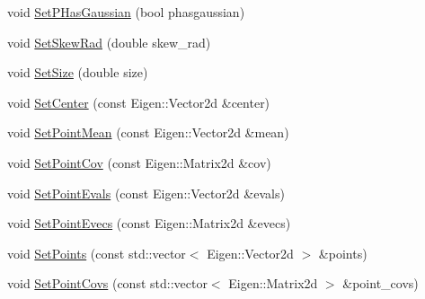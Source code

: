 \begin{DoxyCompactItemize}
\item 
void \hyperlink{classCellInterface_a9128ca32285aa988cea84164ba08096b}{Set\+P\+Has\+Gaussian} (bool phasgaussian)
\item 
void \hyperlink{classCellInterface_a2dd7e0d29d71fa86b9abb188a77fdf03}{Set\+Skew\+Rad} (double skew\+\_\+rad)
\item 
void \hyperlink{classCellInterface_a100dd6525d41dc526848a5f0e96052d4}{Set\+Size} (double size)
\item 
void \hyperlink{classCellInterface_ac566923857bbfb7f6cf9c69bc8efd241}{Set\+Center} (const Eigen\+::\+Vector2d \&center)
\item 
void \hyperlink{classCellInterface_a4d6d4a597eb09ba2098ae62f0a846e80}{Set\+Point\+Mean} (const Eigen\+::\+Vector2d \&mean)
\item 
void \hyperlink{classCellInterface_a4f7df38faf10bc512fa7a640f6ec379e}{Set\+Point\+Cov} (const Eigen\+::\+Matrix2d \&cov)
\item 
void \hyperlink{classCellInterface_a5810d27097b1ecb8a4f4764ea18cec51}{Set\+Point\+Evals} (const Eigen\+::\+Vector2d \&evals)
\item 
void \hyperlink{classCellInterface_a34d4b95685b82f27d36479e868c35faa}{Set\+Point\+Evecs} (const Eigen\+::\+Matrix2d \&evecs)
\item 
void \hyperlink{classCellInterface_a6597daae0e13681de7c666828ab7a722}{Set\+Points} (const std\+::vector$<$ Eigen\+::\+Vector2d $>$ \&points)
\item 
void \hyperlink{classCellInterface_a3ad8b58a4d938ea29392576d74ef61df}{Set\+Point\+Covs} (const std\+::vector$<$ Eigen\+::\+Matrix2d $>$ \&point\+\_\+covs)
\end{DoxyCompactItemize}
